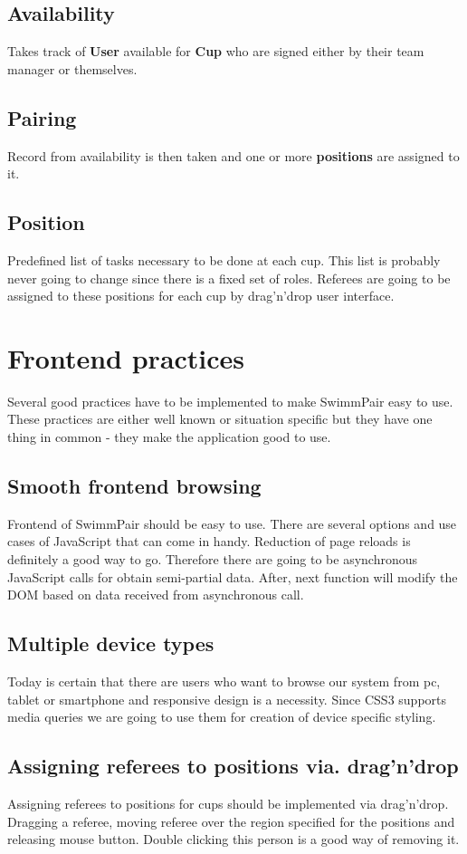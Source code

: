 \subsection*{Availability}
Takes track of \textbf{User} available for \textbf{Cup} who are signed either by their team manager or themselves.
\subsection*{Pairing}
Record from availability is then taken and one or more \textbf{positions} are assigned to it. 
\subsection*{Position}
Predefined list of tasks necessary to be done at each cup. This list is probably never going to change since there is a fixed set of roles. Referees are going to be assigned to these positions for each cup by drag'n'drop user interface.
\newpage
\section{Frontend practices}
Several good practices have to be implemented to make SwimmPair easy to use. These practices are either well known or situation specific but they have one thing in common - they make the application good to use.
\subsection*{Smooth frontend browsing}
\par
Frontend of SwimmPair should be easy to use. There are several options and use cases of JavaScript that can come in handy. Reduction of page reloads is definitely a good way to go. Therefore there are going to be asynchronous JavaScript calls for obtain semi-partial data. After, next function will modify the DOM based on data received from asynchronous call. 
\subsection*{Multiple device types}
\par
Today is certain that there are users who want to browse our system from pc, tablet or smartphone and responsive design is a necessity. Since CSS3 supports media queries we are going to use them for creation of device specific styling.
\subsection*{Assigning referees to positions via. drag'n'drop}
\par
Assigning referees to positions for cups should be implemented via drag'n'drop. Dragging a referee, moving referee over the region specified for the positions and releasing mouse button. Double clicking this person is a good way of removing it.
